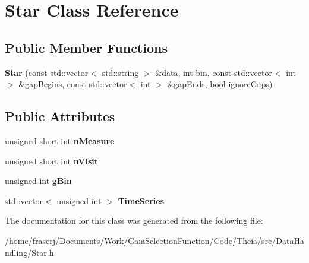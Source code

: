 \hypertarget{classStar}{}\section{Star Class Reference}
\label{classStar}
\subsection*{Public Member Functions}
\begin{DoxyCompactItemize}
\item 
\mbox{\label{classStar_aace160d83fb4be45f11ca9db7dc7d51c}} 
{\bfseries Star} (const std\+::vector$<$ std\+::string $>$ \&data, int bin, const std\+::vector$<$ int $>$ \&gap\+Begins, const std\+::vector$<$ int $>$ \&gap\+Ends, bool ignore\+Gaps)
\end{DoxyCompactItemize}
\subsection*{Public Attributes}
\begin{DoxyCompactItemize}
\item 
\mbox{\label{classStar_abbd3c299046233f3e5f2cf100981e05e}} 
unsigned short int {\bfseries n\+Measure}
\item 
\mbox{\label{classStar_ac00a219fe6c887b16cb72e263c676ea9}} 
unsigned short int {\bfseries n\+Visit}
\item 
\mbox{\label{classStar_a5d29a213dddb43a01b5058486ce6e323}} 
unsigned int {\bfseries g\+Bin}
\item 
\mbox{\label{classStar_aaf5c50e6d1c9905c76a0bc2922de97d0}} 
std\+::vector$<$ unsigned int $>$ {\bfseries Time\+Series}
\end{DoxyCompactItemize}


The documentation for this class was generated from the following file\+:\begin{DoxyCompactItemize}
\item 
/home/fraserj/\+Documents/\+Work/\+Gaia\+Selection\+Function/\+Code/\+Theia/src/\+Data\+Handling/Star.\+h\end{DoxyCompactItemize}
